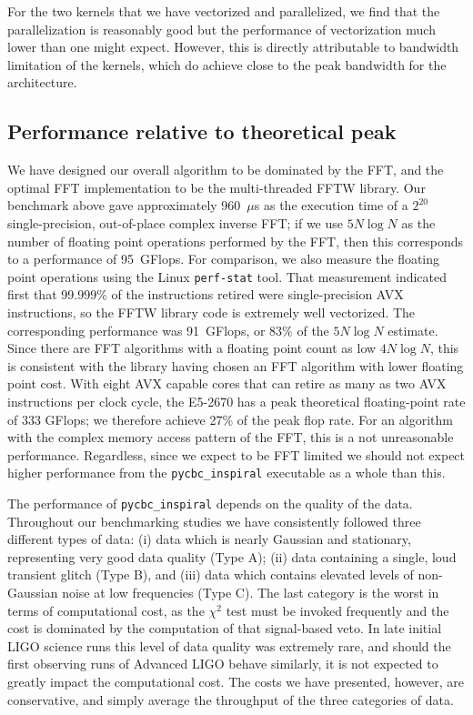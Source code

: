\enlargethispage*{1000pt}
For the two kernels that we have vectorized and parallelized, we
find that the parallelization is reasonably good but the performance of
vectorization much lower than one might expect. However, this is directly
attributable to bandwidth limitation of the kernels, which do achieve close to
the peak bandwidth for the architecture.
\vspace*{15pt}

\vspace*{-40pt}
\subsection{Performance relative to theoretical peak}
\vspace*{-05pt}
\label{sec:perf-relat-theor}

We have designed our overall algorithm to be dominated by
the FFT, and the optimal FFT implementation to be the multi-threaded FFTW
library. Our benchmark above gave approximately 960~$\mu$s as the execution time
of a $2^{20}$ single-precision, out-of-place complex inverse FFT; if we use
$5N\log{N}$ as the number of floating point 
operations performed by the FFT, then this corresponds to a performance of
95~GFlops. For comparison, we also measure the floating point operations using
the Linux \texttt{perf-stat} tool.  That measurement indicated first that
99.999\% of the instructions retired were single-precision AVX instructions, so
the FFTW library code is extremely well vectorized.  The corresponding
performance was 91~GFlops, or 83\% of the $5N\log{N}$ estimate. Since there are
FFT algorithms with a floating point count as low $4N\log{N}$, this is
consistent with the library having chosen an FFT algorithm with lower floating
point cost.  With eight AVX capable cores that can retire as many as two AVX
instructions per clock cycle, the E5-2670 has a peak theoretical floating-point
rate of 333 GFlops; we therefore achieve 27\% of the peak flop rate.  For an
algorithm with the complex memory access pattern of the FFT, this is a not
unreasonable performance. Regardless, since we expect to be FFT limited we
should not expect higher performance from the \texttt{pycbc\_inspiral}
executable as a whole than this. 

The performance of \texttt{pycbc\_inspiral} depends on the quality of the
data. Throughout our benchmarking studies we have consistently followed three
different types of data: (i) data which is nearly Gaussian and stationary,
representing very good data quality (Type A); (ii) data containing a single,
loud transient glitch (Type B), and (iii) data which contains elevated levels of
non-Gaussian noise at low frequencies (Type C).  The last category is the
worst in terms of computational cost, as the $\chi^2$ test must be invoked
frequently and the cost is dominated by the computation of that signal-based
veto. In late initial LIGO science runs this level of data quality was
extremely rare, and should the first observing runs of Advanced LIGO behave
similarly, it is not expected to greatly impact the computational cost.  The
costs we have presented, however, are conservative, and simply average the
throughput of the three categories of data.

